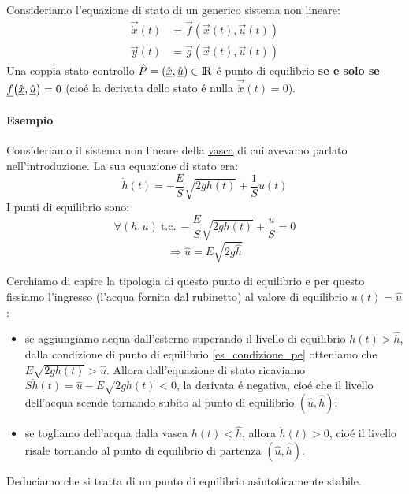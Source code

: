 \documentclass[../main.tex]{subfiles}
\begin{document}
		\begin{definition}
			Consideriamo l'equazione di stato di un generico sistema non lineare:
			\begin{align*}
				\vec{\dot x}(t) &= \vec f(\vec x(t), \vec u(t))
				\\
				\vec y(t) &= \vec g(\vec x(t), \vec u(t))
			\end{align*}
			Una coppia stato-controllo $ \hat P = (\hat{\underline x}, \hat{\underline u}) \in \rm I\!R $ \'e punto di equilibrio \textbf{se e solo se} $ \underline f \big( \hat{\underline x}, \hat{\underline u} \big) = 0 $ (cio\'e la derivata dello stato \'e nulla $ \vec{\dot x}(t) = 0 $).
		\end{definition}
		
		\begin{mdframed}[style=Esempio]
			\paragraph{Esempio}
			Consideriamo il sistema non lineare della \hyperref[sec:vasca]{vasca} di cui avevamo parlato nell'introduzione. La sua equazione di stato era:
			\[
				\dot h(t) = -\dfrac{E}{S} \sqrt{2g h(t)} + \dfrac{1}{S} u(t)
			\]
			I punti di equilibrio sono:
			\[
				\forall (h, u)\ \text{t.c.}\ -\dfrac{E}{S} \sqrt{2g h(t)} + \dfrac{u}{S} = 0 
			\]
			\begin{equation}
				\label{es_condizione_pe}
				\Rightarrow \hat u = E \sqrt{2g \hat h}
			\end{equation}
			
			Cerchiamo di capire la tipologia di questo punto di equilibrio e per questo fissiamo l'ingresso (l'acqua fornita dal rubinetto) al valore di equilibrio $ u(t) = \hat u $:
			\begin{itemize}
				\item
					se aggiungiamo acqua dall'esterno superando il livello di equilibrio $ h(t) > \hat h $, dalla condizione di punto di equilibrio \ref{es_condizione_pe} otteniamo che $ E \sqrt{2gh(t)} > \hat u $. Allora dall'equazione di stato ricaviamo $ S \dot h(t) = \hat u - E \sqrt{2gh(t)} < 0 $, la derivata \'e negativa, cio\'e che il livello dell'acqua scende tornando subito al punto di equilibrio $ (\hat u, \hat h) $;
				\item
					se togliamo dell'acqua dalla vasca $ h(t) < \hat h $, allora $ \dot h(t) > 0 $, cio\'e il livello risale tornando al punto di equilibrio di partenza $ (\hat u, \hat h) $.
			\end{itemize}
			Deduciamo che si tratta di un punto di equilibrio asintoticamente stabile.
		\end{mdframed}	
		
\end{document}
